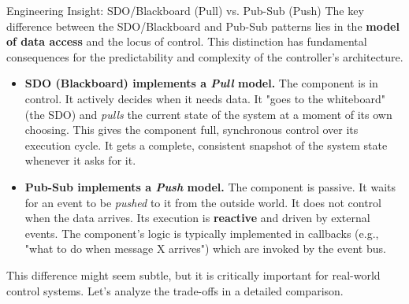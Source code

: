 \begin{tipbox}{Engineering Insight: SDO/Blackboard (Pull) vs. Pub-Sub (Push)}
The key difference between the SDO/Blackboard and Pub-Sub patterns lies in the \textbf{model of data access} and the locus of control. This distinction has fundamental consequences for the predictability and complexity of the controller's architecture.

\begin{itemize}
    \item \textbf{SDO (Blackboard) implements a \textit{Pull} model.} The component is in control. It actively decides when it needs data. It "goes to the whiteboard" (the SDO) and \textit{pulls} the current state of the system at a moment of its own choosing. This gives the component full, synchronous control over its execution cycle. It gets a complete, consistent snapshot of the system state whenever it asks for it.
    
    \item \textbf{Pub-Sub implements a \textit{Push} model.} The component is passive. It waits for an event to be \textit{pushed} to it from the outside world. It does not control when the data arrives. Its execution is \textbf{reactive} and driven by external events. The component's logic is typically implemented in callbacks (e.g., "what to do when message X arrives") which are invoked by the event bus.
\end{itemize}
\end{tipbox}

This difference might seem subtle, but it is critically important for real-world control systems. Let's analyze the trade-offs in a detailed comparison.

